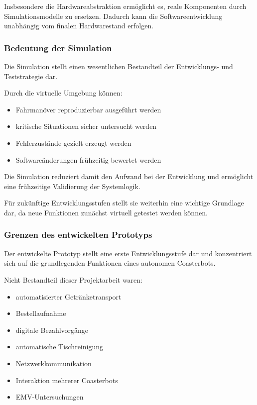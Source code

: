 Insbesondere die Hardwareabstraktion ermöglicht es, reale Komponenten
durch Simulationsmodelle zu ersetzen. Dadurch kann die
Softwareentwicklung unabhängig vom finalen Hardwarestand erfolgen.

\subsubsection{Bedeutung der Simulation}\label{bedeutung-der-simulation}

Die Simulation stellt einen wesentlichen Bestandteil der Entwicklungs-
und Teststrategie dar.

Durch die virtuelle Umgebung können:

\begin{itemize}
\tightlist
\item
  Fahrmanöver reproduzierbar ausgeführt werden
\item
  kritische Situationen sicher untersucht werden
\item
  Fehlerzustände gezielt erzeugt werden
\item
  Softwareänderungen frühzeitig bewertet werden
\end{itemize}

Die Simulation reduziert damit den Aufwand bei der Entwicklung und
ermöglicht eine frühzeitige Validierung der Systemlogik.

Für zukünftige Entwicklungsstufen stellt sie weiterhin eine wichtige
Grundlage dar, da neue Funktionen zunächst virtuell getestet werden
können.

\subsubsection{Grenzen des entwickelten
Prototyps}\label{grenzen-des-entwickelten-prototyps}

Der entwickelte Prototyp stellt eine erste Entwicklungsstufe dar und
konzentriert sich auf die grundlegenden Funktionen eines autonomen
Coasterbots.

Nicht Bestandteil dieser Projektarbeit waren:

\begin{itemize}
\tightlist
\item
  automatisierter Getränketransport
\item
  Bestellaufnahme
\item
  digitale Bezahlvorgänge
\item
  automatische Tischreinigung
\item
  Netzwerkkommunikation
\item
  Interaktion mehrerer Coasterbots
\item
  EMV-Untersuchungen
\end{itemize}

